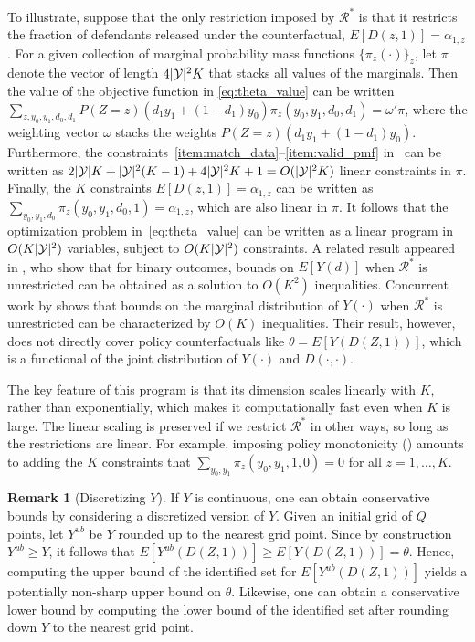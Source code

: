 \documentclass[12pt]{article}%
\theoremstyle{definition}
\newtheorem{remark}{Remark}
\DeclarePairedDelimiter\abs{\lvert}{\rvert}
\newcommand\1{\operatorname{I}\indicatorfence}
\begin{document}
To illustrate, suppose that the only restriction imposed by $\mathcal{R}^{*}$ is
that it restricts the fraction of defendants released under the counterfactual,
$E[D(z,1)]=\alpha_{1, z}$. For a given collection of marginal probability mass
functions $\{\pi_{z}(\cdot)\}_{z}$, let $\pi$ denote the vector of length
$4\abs{\mathcal{Y}}^{2}K$ that stacks all values of the marginals. Then the
value of the objective function in \cref{eq:theta_value} can be written
$\sum_{z, y_{0}, y_1, d_0, d_1} P(Z=z) (d_1 y_1 + (1-d_1) y_0) \pi_{z}(y_0, y_1,
d_0, d_1)= \omega' \pi$, where the weighting vector $\omega$ stacks the weights
$P(Z=z) (d_1 y_1 + (1-d_1) y_0)$. Furthermore, the
constraints~\ref{item:match_data}--\ref{item:valid_pmf}
in~ can be written as
$2\abs{\mathcal{Y}}K+\abs{\mathcal{Y}}^{2}(K-1)+4\abs{\mathcal{Y}}^{2}K+1=O(\abs{\mathcal{Y}}^{2}K)$
linear constraints in $\pi$. Finally, the $K$ constraints
$E[D(z,1)]=\alpha_{1, z}$ can be written as
$\sum_{y_{0}, y_{1}, d_{0}}\pi_{z}(y_{0}, y_{1}, d_{0},1)=\alpha_{1, z}$, which are
also linear in $\pi$. It follows that the optimization problem
in~\cref{eq:theta_value} can be written as a linear program in
$O(K\abs{\mathcal{Y}}^{2})$ variables, subject to $O(K\abs{\mathcal{Y}}^{2})$
constraints. A related result appeared in \textcite{RiRo14}, who show that for
binary outcomes, bounds on $E[Y(d)]$ when $\mathcal{R}^{*}$ is unrestricted can
be obtained as a solution to $O(K^2)$ inequalities. Concurrent work by \textcite{song_categorical_2025} shows that bounds on the marginal distribution of $Y(\cdot)$ when $\mathcal{R}^*$ is unrestricted can be characterized by $O(K)$ inequalities. Their result, however, does not directly cover policy counterfactuals like $\theta = E[Y(D(Z,1))]$, which is a functional of the joint distribution of $Y(\cdot)$ and $D(\cdot, \cdot)$.

The key feature of this program is that its dimension scales linearly with $K$,
rather than exponentially, which makes it computationally fast even when $K$ is
large. The linear scaling is preserved if we restrict $\mathcal{R}^{*}$ in
other ways, so long as the restrictions are linear. For example, imposing policy
monotonicity () amounts to adding the $K$
constraints that $\sum_{y_{0}, y_{1}}\pi_z(y_0,y_1, 1, 0) = 0$ for all $z=1, \dotsc, K$.

\begin{remark}[Discretizing $Y$]
  If $Y$ is continuous, one can obtain conservative bounds by considering a
  discretized version of $Y$. Given an initial grid of $Q$ points, let $Y^{ub}$
  be $Y$ rounded up to the nearest grid point. Since by construction
  $Y^{ub} \geq Y$, it follows that
  $E[Y^{ub}(D(Z,1))] \geq E[Y(D(Z,1))] = \theta$. Hence, computing the upper
  bound of the identified set for $E[Y^{ub}(D(Z,1))]$ yields a potentially
  non-sharp upper bound on $\theta$. Likewise, one can obtain a conservative
  lower bound by computing the lower bound of the identified set after rounding
  down $Y$ to the nearest grid point.
\end{remark}
\end{document}
